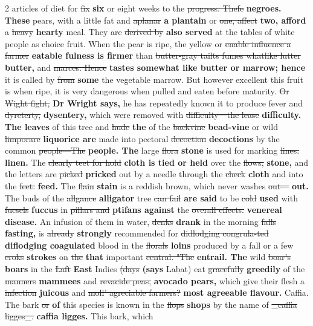 \documentclass[10pt]{article}
\begin{document}
\begin{multicols}{2}
articles of diet for \sout{fix} \textbf{six} or eight weeks to the \sout{progress. Thefe} \textbf{negroes. These} pears, with a little fat and \sout{aplanar} \textbf{a plantain} or \sout{one, affect} \textbf{two, afford} a \sout{heavy} \textbf{hearty} meal. They are \sout{derived by} \textbf{also served} at the tables of white people as choice fruit. When the pear is ripe, the yellow or \sout{enable influence a farmer} \textbf{eatable fulness is firmer} than \sout{butter-gray tailts fumes whatlike lutter} \textbf{butter,} and \sout{marces. Hence} \textbf{tastes somewhat like butter or marrow; hence} it is called by \sout{from} \textbf{some} the vegetable marrow. But however excellent this fruit is when ripe, it is very dangerous when pulled and eaten before maturity. \sout{Or Wight fight,} \textbf{Dr Wright says,} he has repeatedly known it to produce fever and \sout{dyreterty,} \textbf{dysentery,} which were removed with \sout{difficulty—the lease} \textbf{difficulty. The leaves} of this tree and \sout{hude} \textbf{the} of the \sout{backvine} \textbf{bead-vine} or wild \sout{limporare} \textbf{liquorice are} made into pectoral \sout{decoction} \textbf{decoctions} by the common \sout{people—The} \textbf{people. The} large \sout{flora} \textbf{stone} is used for marking \sout{lines.} \textbf{linen.} The \sout{clearly teet for hold} \textbf{cloth is tied or held} over the \sout{flows,} \textbf{stone,} and the letters are \sout{picked} \textbf{pricked} out by a needle through the \sout{check} \textbf{cloth} and into the \sout{feet.} \textbf{feed.} The \sout{flain} \textbf{stain} is a reddish brown, which never washes \sout{out—} \textbf{out.} The buds of the \sout{allgance} \textbf{alligator} tree \sout{can fail} \textbf{are said} to be \sout{cold} \textbf{used} with \sout{fucsels} \textbf{fuccus} in \sout{pillars and} \textbf{ptifans against} the \sout{overall effects.} \textbf{venereal disease.} An infusion of them in water, \sout{denks} \textbf{drank} in the morning \sout{falls} \textbf{fasting,} is \sout{already} \textbf{strongly} recommended for \sout{didlodging congrula-ted} \textbf{diflodging coagulated} blood in the \sout{florals} \textbf{loins} produced by a fall or a few \sout{eroks} \textbf{strokes} on \sout{the} \textbf{that} important \sout{central. "The} \textbf{entrail. The} wild \sout{boar's} \textbf{boars} in the \sout{Laft} \textbf{East} Indies \sout{(days} \textbf{(says} Labat) eat \sout{gracefully} \textbf{greedily} of the \sout{manners} \textbf{mammees} and \sout{revacide peas,} \textbf{avocado pears,} which give their flesh a \sout{infection} \textbf{juicous} and \sout{moll' agreciable farmers?} \textbf{most agreeable flavour.} Caffia. The bark \sout{or} \textbf{of} this species is known in the \sout{flops} \textbf{shops} by the name of \sout{\_caffia ligges\_.} \textbf{caffia ligges.} This bark, which
\end{multicols}
\end{document}
